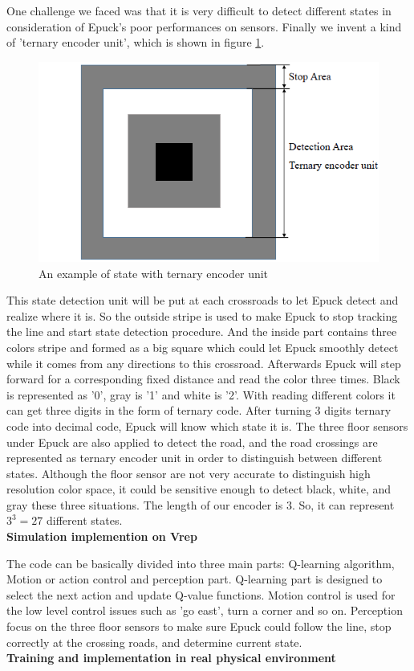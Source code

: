 \documentclass[a4paper, 11pt]{article} %
\begin{document}
One challenge we faced was that it is very difficult to detect different states in consideration of Epuck's poor performances on sensors. Finally we invent a kind of 'ternary encoder unit', which is shown in figure \ref{fig2}.
\begin{figure}[tb]
\centering
\includegraphics[width=0.6\columnwidth]{encoder}
\caption[An example of a floating figure]{An example of state with ternary encoder unit} %
\label{fig2}
\end{figure}
This state detection unit will be put at each crossroads to let Epuck detect and realize where it is.
So the outside stripe is used to make Epuck to stop tracking the line and start state detection procedure.
And the inside part contains three colors stripe and formed as a big square which could let Epuck smoothly detect while it comes from any directions to this crossroad.
Afterwards Epuck will step forward for a corresponding fixed distance and read the color three times.
Black is represented as '0', gray is '1' and white is '2'. With reading different colors it can get three digits in the form of ternary code.
After turning 3 digits ternary code into decimal code, Epuck will know which state it is.
The three floor sensors under Epuck are also applied to detect the road, and the
road crossings are represented as ternary encoder unit in order to distinguish
between different states. Although the floor sensor are not very accurate to
distinguish high resolution color space, it could be sensitive enough to detect
black, white, and gray these three situations. The length of our encoder is 3.
So, it can represent $3^3 = 27$ different states.
\\[3ex]
\textbf{Simulation implemention on Vrep}

The code can be basically divided
into three main parts: Q-learning algorithm, Motion or action control and
perception part. Q-learning part is designed to select the next action and update
Q-value functions. Motion control is used for the low level control issues such as
'go east', turn a corner and so on. Perception focus on the three floor sensors
to make sure Epuck could follow the line, stop correctly at the crossing roads,
and determine current state.
\\[3ex]
\textbf{Training and implementation in real physical environment}
\end{document}
